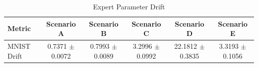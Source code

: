 \documentclass{article}
\begin{document}
\begin{table}[t]
\caption{Expert Parameter Drift}
\vskip 0.15in
\begin{center}
\small
\scshape
\begin{tabular}{lccccc}
\toprule
Metric & Scenario A & Scenario B & Scenario C & Scenario D & Scenario E \\
\midrule
MNIST Drift & 0.7371 $\pm$ 0.0072 & 0.7993 $\pm$ 0.0089 & 3.2996 $\pm$ 0.0992 & 22.1812 $\pm$ 0.3835 & 3.3193 $\pm$ 0.1056 \\
\bottomrule
\end{tabular}
\end{center}
\end{table}
\end{document}
